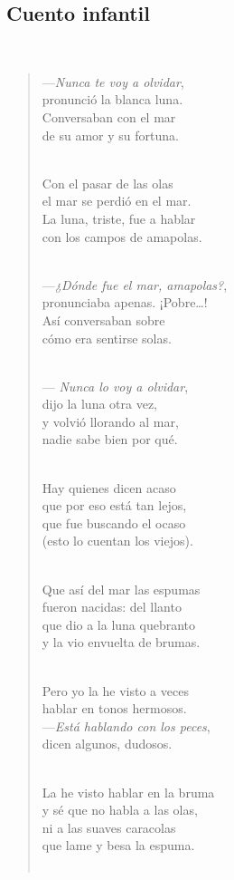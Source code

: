 \documentclass[a4paper, 12pt]{article}
\begin{document}
\subsection{Cuento infantil}
~ 
\begin{verse}
    
—\textit{Nunca te voy a olvidar},\\
pronunció la blanca luna.\\
Conversaban con el mar\\
de su amor y su fortuna.\\
~ 

Con el pasar de las olas\\
el mar se perdió en el mar.\\
La luna, triste, fue a hablar\\
con los campos de amapolas.\\
~ 

—\textit{¿Dónde fue el mar, amapolas?},\\
pronunciaba apenas. ¡Pobre…!\\
Así conversaban sobre\\
cómo era sentirse solas.\\
~ 

— \textit{Nunca lo voy a olvidar},\\
dijo la luna otra vez,\\
y volvió llorando al mar,\\
nadie sabe bien por qué.\\
~ 

Hay quienes dicen acaso\\
que por eso está tan lejos,\\
que fue buscando el ocaso\\
(esto lo cuentan los viejos).\\
~ 

Que así del mar las espumas\\
fueron nacidas: del llanto\\
que dio a la luna quebranto\\
y la vio envuelta de brumas.\\
~ 

Pero yo la he visto a veces\\
hablar en tonos hermosos.\\
—\textit{Está hablando con los peces},\\
 dicen algunos, dudosos.\\
 ~ 

La he visto hablar en la bruma\\
y sé que no habla a las olas,\\
ni a las suaves caracolas\\
que lame y besa la espuma.\\
~ 


\end{verse}
\end{document}

